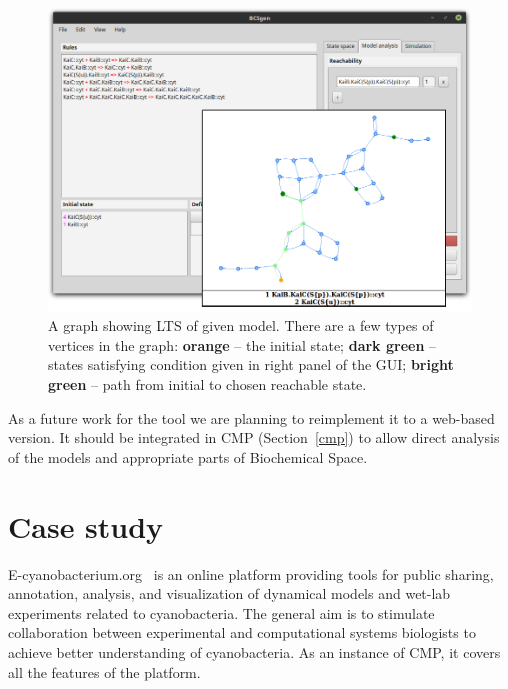\documentclass[12pt]{fithesis2}
\begin{document}
\begin{figure}[!h]
\begin{center}
\includegraphics[scale=0.3]{pics/BCSgen_reach}
\caption{A graph showing LTS of given model. There are a few types of vertices in the graph: \textbf{orange} -- the initial state; \textbf{dark green} -- states satisfying condition given in right panel of the GUI; \textbf{bright green} -- path from initial to chosen reachable state.}\label{gui_reach}
\end{center}
\end{figure}

As a future work for the tool we are planning to reimplement it to a web-based version. It should be integrated in CMP (Section~\ref{cmp}) to allow direct analysis of the models and appropriate parts of Biochemical Space. 

\chapter{Case study}
\label{case_study}

E-cyanobacterium.org~\cite{Trojak2016} is an online platform providing tools for public sharing, annotation, analysis, and visualization of dynamical models and wet-lab experiments related to cyanobacteria. The general aim is to stimulate collaboration between experimental and computational systems biologists to achieve better understanding of cyanobacteria. As an instance of CMP, it covers all the features of the platform.
\end{document}

